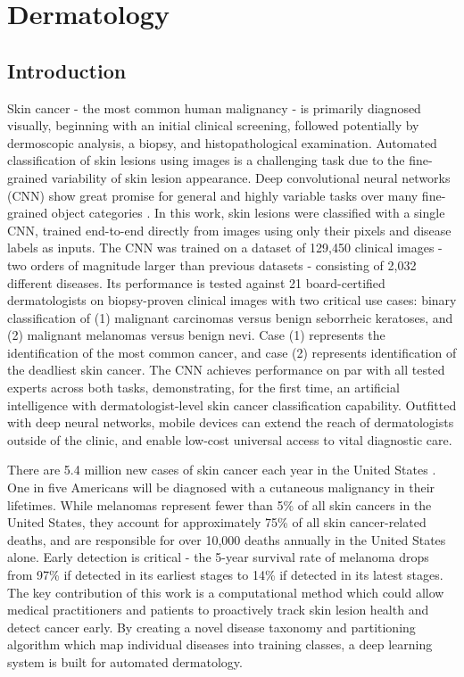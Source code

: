 \chapter{Dermatology}

\section{Introduction}
Skin cancer - the most common human malignancy \cite{society2016cancer, rogers2015incidence, stern2010prevalence} - is primarily diagnosed visually, beginning with an initial clinical screening, followed potentially by dermoscopic analysis, a biopsy, and histopathological examination. Automated classification of skin lesions using images is a challenging task due to the fine-grained variability of skin lesion appearance. Deep convolutional neural networks (CNN) \cite{lecun2015deep, lecun1998handbook} show great promise for general and highly variable tasks over many fine-grained object categories \cite{russakovsky2015imagenet, krizhevsky2012imagenet, ioffe2015batch,  szegedy2016rethinking, szegedy2015going, he2016deep}. In this work, skin lesions were classified with a single CNN, trained end-to-end directly from images using only their pixels and disease labels as inputs. The CNN was trained on a dataset of 129,450 clinical images - two orders of magnitude larger than previous datasets \cite{masood2013computer} - consisting of 2,032 different diseases. Its performance is tested against 21 board-certified dermatologists on biopsy-proven clinical images with two critical use cases: binary classification of (1) malignant carcinomas versus benign seborrheic keratoses, and (2) malignant melanomas versus benign nevi. Case (1) represents the identification of the most common cancer, and case (2) represents identification of the deadliest skin cancer. The CNN achieves performance on par with all tested experts across both tasks, demonstrating, for the first time, an artificial intelligence with dermatologist-level skin cancer classification capability. Outfitted with deep neural networks, mobile devices can extend the reach of dermatologists outside of the clinic, and enable low-cost universal access to vital diagnostic care. 

There are 5.4 million new cases of skin cancer each year in the United States \cite{rogers2015incidence}. One in five Americans will be diagnosed with a cutaneous malignancy in their lifetimes. While melanomas represent fewer than 5\% of all skin cancers in the United States, they account for approximately 75\% of all skin cancer-related deaths, and are responsible for over 10,000 deaths annually in the United States alone. Early detection is critical - the 5-year survival rate of melanoma drops from 97\% if detected in its earliest stages to 14\% if detected in its latest stages. The key contribution of this work is a computational method which could allow medical practitioners and patients to proactively track skin lesion health and detect cancer early. By creating a novel disease taxonomy and partitioning algorithm which map individual diseases into training classes, a deep learning system is built for automated dermatology. 

